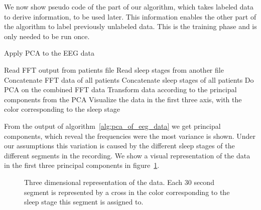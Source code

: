 \newpage

We now show pseudo code of the part of our algorithm, which takes labeled data to derive information, to be used later. This information enables the other part of the algorithm to label previously unlabeled data. This is the training phase and is only needed to be run once.

\begin{algorithm}[h!]
	\caption{Apply PCA to the EEG data}\label{alg:pca_of_eeg_data}
	\begin{algorithmic}
		\State Read FFT output from patients file
		\State Read sleep stages from another file
		\EndFor
		\State Concatenate FFT data of all patients
		\State Concatenate sleep stages of all patients
		\State Do PCA on the combined FFT data
		\State Transform data according to the principal components from the PCA
		\State Visualize the data in the first three axis, with the color corresponding to the sleep stage
	\end{algorithmic}
\end{algorithm}

From the output of algorithm~\ref{alg:pca_of_eeg_data} we get principal components, which reveal the frequencies were the most variance is shown. Under our assumptions this variation is caused by the different sleep stages of the different segments in the recording. We show a visual representation of the data in the first three principal components in figure~\ref{fig:pca_output_3d}.

\vspace{0.5cm}

\begin{figure}[h]
	\centering	
	\caption{Three dimensional representation of the data. Each 30 second segment is represented by a cross in the color corresponding to the sleep stage this segment is assigned to.}
	\label{fig:pca_output_3d}
\end{figure}


